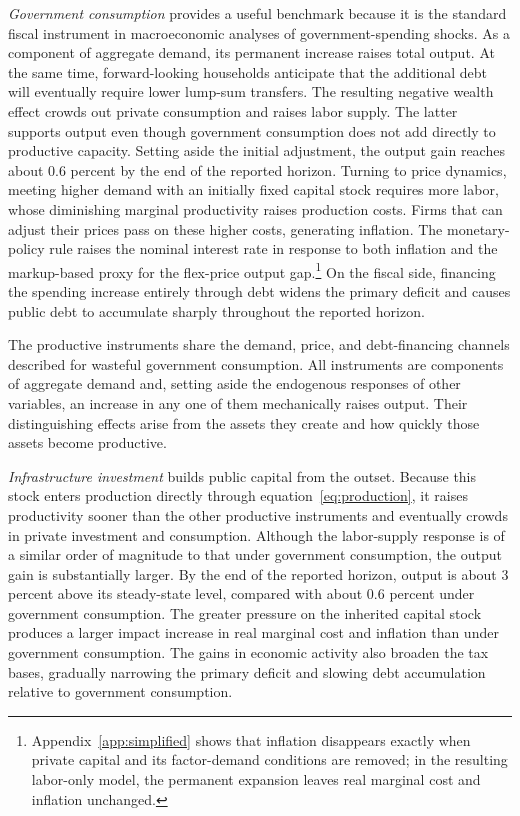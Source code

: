 \documentclass[a4paper,11pt]{article}
\begin{document}
\emph{Government consumption} provides a useful benchmark because it is the standard fiscal instrument in macroeconomic analyses of government-spending shocks.
As a component of aggregate demand, its permanent increase raises total output.
At the same time, forward-looking households anticipate that the additional debt will eventually require lower lump-sum transfers.
The resulting negative wealth effect crowds out private consumption and raises labor supply.
The latter supports output even though government consumption does not add directly to productive capacity.
Setting aside the initial adjustment, the output gain reaches about 0.6 percent by the end of the reported horizon.
Turning to price dynamics, meeting higher demand with an initially fixed capital stock requires more labor, whose diminishing marginal productivity raises production costs.
Firms that can adjust their prices pass on these higher costs, generating inflation.
The monetary-policy rule raises the nominal interest rate in response to both inflation and the markup-based proxy for the flex-price output gap.\footnote{Appendix~\ref{app:simplified} shows that inflation disappears exactly when private capital and its factor-demand conditions are removed; in the resulting labor-only model, the permanent expansion leaves real marginal cost and inflation unchanged.}
On the fiscal side, financing the spending increase entirely through debt widens the primary deficit and causes public debt to accumulate sharply throughout the reported horizon.

The productive instruments share the demand, price, and debt-financing channels described for wasteful government consumption.
All instruments are components of aggregate demand and, setting aside the endogenous responses of other variables, an increase in any one of them mechanically raises output.
Their distinguishing effects arise from the assets they create and how quickly those assets become productive.

\emph{Infrastructure investment} builds public capital from the outset.
Because this stock enters production directly through equation~\eqref{eq:production}, it raises productivity sooner than the other productive instruments and eventually crowds in private investment and consumption.
Although the labor-supply response is of a similar order of magnitude to that under government consumption, the output gain is substantially larger.
By the end of the reported horizon, output is about 3 percent above its steady-state level, compared with about 0.6 percent under government consumption.
The greater pressure on the inherited capital stock produces a larger impact increase in real marginal cost and inflation than under government consumption.
The gains in economic activity also broaden the tax bases, gradually narrowing the primary deficit and slowing debt accumulation relative to government consumption.
\end{document}
